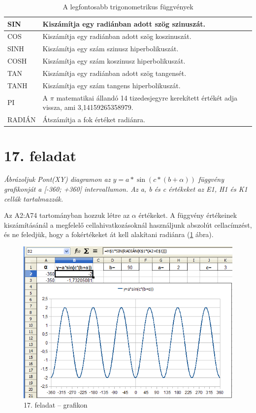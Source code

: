 \begin{table}
\begin{center}
\caption{A legfontosabb trigonometrikus függvények}\label{TrigFüggvények}
\begin{tabular}{|m{2.5cm}|m{8cm}|}
\hline
SIN &
 Kiszámítja egy radiánban adott szög szinuszát.\\ \hline
COS &
 Kiszámítja egy radiánban adott szög koszinuszát.\\ \hline
SINH &
 Kiszámítja egy szám szinusz hiperbolikuszát.\\ \hline
COSH &
 Kiszámítja egy szám koszinusz hiperbolikuszát.\\ \hline
TAN &
 Kiszámítja egy radiánban adott szög tangensét.\\ \hline
TANH &
 Kiszámítja egy szám tangens hiperbolikuszát.\\ \hline
PI &
 A ${\pi}$ matematikai állandó 14 tizedesjegyre kerekített
értékét adja vissza, ami 3,14159265358979.\\ \hline
RADIÁN &
Átszámítja a fok értéket radiánra.\\ \hline
\end{tabular}
\end{center}
\end{table}


\clearpage
\section{17. feladat}

{\itshape
Ábrázoljuk Pont(XY) diagramon az  $y=a\ast \sin (c\ast
(b+\mathit{{\alpha}}))$ függvény grafikonját a [-360; +360]
intervallumon.  Az a, b és c értékeket az E1, H1 és K1 cellák
tartalmazzák.}

Az A2:A74 tartományban hozzuk létre az ${\alpha}$ értékeket. A
függvény értékeinek kiszámításánál a megfelelő
cellahivatkozásoknál használjunk abszolút cellacímzést,
és ne feledjük, hogy a fokértékeket át kell alakítani
radiánra (\ref{17-feladatGrafikon} ábra).

\begin{figure}[!h]
\begin{center}
\includegraphics[width=15.529cm]{oocalcv2-img89.png}
\caption{17. feladat --  grafikon}\label{17-feladatGrafikon}
\end{center}
\end{figure}

